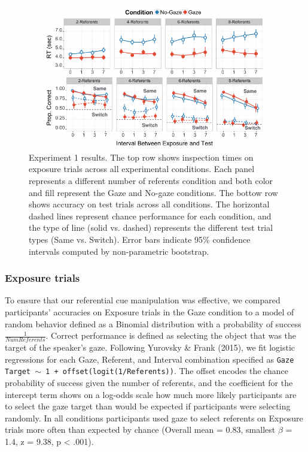 \documentclass[authoryear, review]{elsarticle}
\newenvironment{CodeChunk}{}{}
\begin{document}
\begin{CodeChunk}
\begin{figure}[tb]
\includegraphics{figs/expt1-plot-1} \caption[Experiment 1 results]{Experiment 1 results. The top row shows inspection times on exposure trials across all experimental conditions. Each panel represents a different number of referents condition and both color and fill represent the Gaze and No-gaze conditions. The bottow row shows accuracy on test trials across all conditions. The horizontal dashed lines represent chance performance for each condition, and the type of line (solid vs. dashed) represents the different test trial types (Same vs. Switch). Error bars indicate 95\% confidence intervals computed by non-parametric bootstrap.}\label{fig:expt1-plot}
\end{figure}
\end{CodeChunk}

\subsubsection{Exposure trials}\label{exposure-trials}

To ensure that our referential cue manipulation was effective, we
compared participants' accuracies on Exposure trials in the Gaze
condition to a model of random behavior defined as a Binomial
distribution with a probability of success \(\frac{1}{Num Referents}\).
Correct performance is defined as selecting the object that was the
target of the speaker's gaze. Following Yurovsky \& Frank (2015), we fit
logistic regressions for each Gaze, Referent, and Interval combination
specified as \texttt{Gaze Target $\sim$ 1 + offset(logit(1/Referents))}.
The offset encodes the chance probability of success given the number of
referents, and the coefficient for the intercept term shows on a
log-odds scale how much more likely participants are to select the gaze
target than would be expected if participants were selecting randomly.
In all conditions participants used gaze to select referents on Exposure
trials more often than expected by chance (Overall mean = 0.83, smallest
\(\beta\) = 1.4, z = 9.38, p \textless{} .001).
\end{document}
